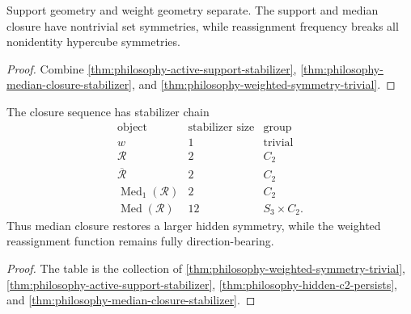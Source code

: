 \begin{corollary}
\label{cor:philosophy-support-symmetry-weight-direction}
Support geometry and weight geometry separate. The support and median
closure have nontrivial set symmetries, while reassignment frequency
breaks all nonidentity hypercube symmetries.
\end{corollary}
\begin{proof}
Combine \autoref{thm:philosophy-active-support-stabilizer},
\autoref{thm:philosophy-median-closure-stabilizer}, and
\autoref{thm:philosophy-weighted-symmetry-trivial}.
\end{proof}

\begin{theorem}
\label{thm:philosophy-symmetry-restoration}
The closure sequence has stabilizer chain
$$
\begin{array}{c|c|c}
  \text{object} & \text{stabilizer size} & \text{group}\\
  \hline
  w & 1 & \text{trivial}\\
  \mathcal{R} & 2 & C_{2}\\
  \overline{\mathcal{R}} & 2 & C_{2}\\
  \operatorname{Med}_{1}(\mathcal{R}) & 2 & C_{2}\\
  \operatorname{Med}(\mathcal{R}) & 12 & S_{3}\times C_{2}.
\end{array}
$$
Thus median closure restores a larger hidden symmetry, while the
weighted reassignment function remains fully direction-bearing.
\end{theorem}
\begin{proof}
The table is the collection of
\autoref{thm:philosophy-weighted-symmetry-trivial},
\autoref{thm:philosophy-active-support-stabilizer},
\autoref{thm:philosophy-hidden-c2-persists}, and
\autoref{thm:philosophy-median-closure-stabilizer}.
\end{proof}

